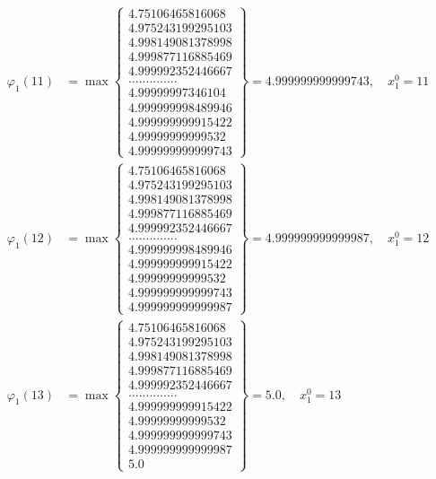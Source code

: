 \documentclass{article}
\begin{document}
\begin{align*}
  
  
  
\varphi_{1}(11) &= \max \left\{ \begin{array}{c}
4.75106465816068 \\
 4.975243199295103 \\
 4.998149081378998 \\
 4.999877116885469 \\
 4.999992352446667 \\
 .............. \\
 4.99999997346104 \\
 4.999999998489946 \\
 4.999999999915422 \\
 4.99999999999532 \\
 4.999999999999743
\end{array} \right\} = 4.999999999999743, \quad x_{1}^0 = 11\\
  
  
  
  
\varphi_{1}(12) &= \max \left\{ \begin{array}{c}
4.75106465816068 \\
 4.975243199295103 \\
 4.998149081378998 \\
 4.999877116885469 \\
 4.999992352446667 \\
 .............. \\
 4.999999998489946 \\
 4.999999999915422 \\
 4.99999999999532 \\
 4.999999999999743 \\
 4.999999999999987
\end{array} \right\} = 4.999999999999987, \quad x_{1}^0 = 12\\
  
  
  
  
\varphi_{1}(13) &= \max \left\{ \begin{array}{c}
4.75106465816068 \\
 4.975243199295103 \\
 4.998149081378998 \\
 4.999877116885469 \\
 4.999992352446667 \\
 .............. \\
 4.999999999915422 \\
 4.99999999999532 \\
 4.999999999999743 \\
 4.999999999999987 \\
 5.0
\end{array} \right\} = 5.0, \quad x_{1}^0 = 13\\
  

\end{align*}
\end{document}
